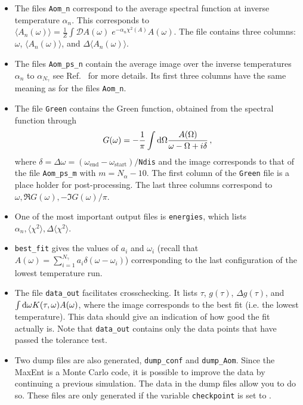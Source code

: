 \begin{itemize}
\item The files  \texttt{Aom\_n}  correspond to the average spectral function at inverse  temperature  $ \alpha_n $. This corresponds to
$  \langle A_n(\omega) \rangle =   \frac{1}{Z}   \int \mathcal{D}\!A(\omega) \; e^{-\alpha_n \chi^{2}(A)  } A(\omega). $
The file contains three columns: $\omega$, $\langle A_n(\omega) \rangle$, and $\Delta \langle A_n(\omega) \rangle$.

\item The files \texttt{Aom\_ps\_n}   contain the average image over  the  inverse   temperatures  $ \alpha_n $ to $ \alpha_{N_\gamma} $  see Ref.~\cite{Beach04a} for more details.   
 Its first three columns have the same meaning as for the files \texttt{Aom\_n}.

\item The file \texttt{Green} contains the Green function, obtained from the spectral function through
\begin{equation}
 G(\omega) =  -\frac{1}{\pi} \int \mathrm{d} \Omega   \frac{A(\Omega)}{\omega - \Omega + i \delta} \,,
\end{equation}
where  $ \delta =  \Delta \omega = (\omega_\mathrm{end} -  \omega_\mathrm{start})/$\texttt{Ndis} and the image corresponds to that of the file \texttt{Aom\_ps\_m} with $ m = N_{\alpha} -10 $. 
The first column of the  \texttt{Green}  file is a place holder for post-processing. The last three columns   correspond to $\omega, \Re G(\omega) ,   - \Im G(\omega)/\pi $. 

\item  One of the most important output files is \texttt{energies}, which lists $ \alpha_n, \langle \chi^2 \rangle, \Delta \langle \chi^2 \rangle $.

\item  \texttt{best\_fit}  gives the values of $a_i$ and $\omega_i$   (recall that $ A(\omega)  = \sum_{i=1}^{N_{\gamma}} a_{i} \delta \left( \omega - \omega_i \right)$) corresponding to the last configuration of the  lowest temperature run.

\item The file \texttt{data\_out} facilitates crosschecking. It lists $\tau$,  $g(\tau)$, $\Delta g(\tau)$, and $\int \mathrm{d} \omega  K(\tau, \omega) A(\omega)$, where the image corresponds to the best fit (i.e. the lowest temperature). This data should give an indication of how good the fit actually is.  Note that  \texttt{data\_out} contains only the data points that have  passed the tolerance test. 

\item Two dump files are also generated, \texttt{dump\_conf} and \texttt{dump\_Aom}. Since the MaxEnt is a Monte Carlo code, it is possible to improve the data by continuing a previous simulation. The data in the dump files allow you to do so. These files are only generated if the variable \texttt{checkpoint} is set to . 

\end{itemize}

